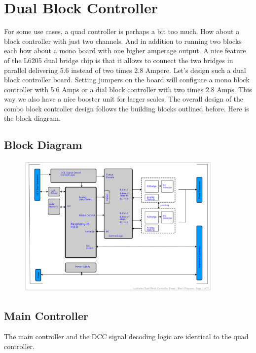 \section{Dual Block Controller}

For some use cases, a quad controller is perhaps a bit too much. How about a block controller with just two channels. And in addition to running two blocks each how about a mono board with one higher amperage output. A nice feature of the L6205 dual bridge chip is that it allows to connect the two bridges in parallel delivering 5.6 instead of two times 2.8 Ampere. Let's design such a dual block controller board. Setting jumpers on the board will configure a mono block controller with 5.6 Amps or a dial block controller with two times 2.8 Amps. This way we also have a nice booster unit for larger scales. The overall design of the combo block controller design follows the building blocks outlined before. Here is the block diagram.

\subsection{Block Diagram}

\begin{figure}[htbp]
    \centering
    \includegraphics[page=1, width=0.9\textwidth]{./Schematics/Schematic_LcsNodes-Dual-Block-Controller.pdf}
\end{figure}
\FloatBarrier

\subsection{Main Controller}

The main controller and the DCC signal decoding logic are identical to the quad controller.

